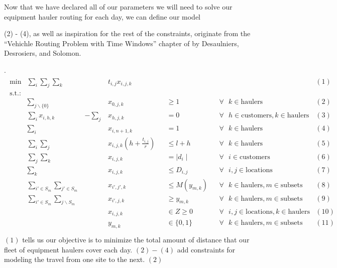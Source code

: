 \documentclass[letterpaper,10pt,english]{sphinxmanual}
\begin{document}
Now that we have declared all of our parameters we will need to solve our
equipment hauler routing for each day, we can define our model %
\begin{footnote}[1]\sphinxAtStartFootnote
(2) - (4), as well as inspiration for the rest of the constraints,
originate from the ``Vehichle Routing Problem with Time Windows'' chapter
of  by Desaulniers, Desrosiers, and Solomon.
%
\end{footnote} .
\begin{align*}\!\begin{aligned}
\text{min} &\sum_{i} \sum_{j} \sum_{k} & &t_{i,j}x_{i,j,k} & & & & &(1)\\
\text{s.t.:}\\
&\sum_{j\backslash\{0\}} & &x_{0,j,k} & &\geq 1 & &\forall \text{ } k \in
\text{haulers} &(2)\\
&\sum_{i} x_{i,h,k} &-\sum_{j} &x_{h,j,k} & &= 0 & &\forall \text{ } h \in
\text{customers}, k \in \text{haulers} &(3)\\
&\sum_{i} & &x_{i,n+1,k} & &= 1 & &\forall \text{ } k \in \text{haulers}
&(4)\\
&\sum_{i} \sum_{j} & &x_{i,j,k}(h + \frac{t_{i,j}}{r}) & &\leq l + h &
&\forall \text{ } k \in \text{haulers} &(5)\\
&\sum_{j} \sum_{k} & &x_{i,j,k} & &= \mid d_{i} \mid & &\forall \text{ } i
\in \text{customers} &(6)\\
&\sum_{k} & &x_{i,j,k} & &\leq D_{i,j} & &\forall \text{ } i,j \in
\text{locations} &(7)\\
&\sum_{i' \in S_{m}} \sum_{j' \in S_{m}} & &x_{i',j',k} & &\leq M(y_{m,k}) &
&\forall \text{ } k \in \text{haulers}, m \in \text{subsets} &(8)\\
&\sum_{i' \in S_{m}} \sum_{j \backslash S_{m}} & &x_{i',j,k} & &\geq
y_{m,k} & &\forall \text{ } k \in \text{haulers}, m \in \text{subsets} &(9)\\
& & &x_{i,j,k} & &\in Z \geq 0 & &\forall \text{ } i,j \in \text{locations},
k \in \text{haulers} &(10)\\
& & &y_{m,k} & &\in \{0,1\} & &\forall \text{ } k \in \text{haulers}, m
\in \text{subsets} &(11)\\
\end{aligned}\end{align*}
\((1)\) tells us our objective is to minimize the total amount of distance
that our fleet of equipment haulers cover each day. \((2)-(4)\) add
constraints for modeling the travel from one site to the next. \((2)\)
\end{document}
